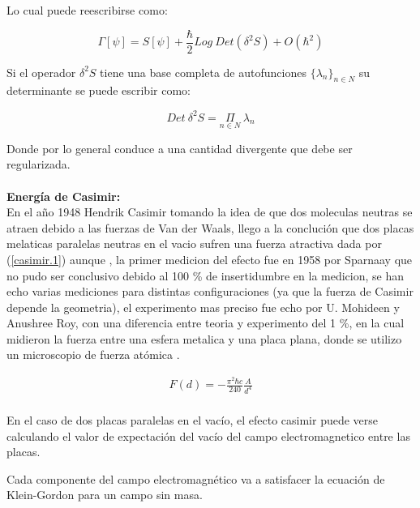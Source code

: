 Lo cual puede reescribirse como:

\begin{equation}
\Gamma [\psi] = S [\psi] + \frac{\hbar}{2} Log \ Det ( \delta ^2 S ) +
O ( \hbar ^2 )
\end{equation}


Si el operador $ \delta ^2 S $ tiene una base completa de autofunciones $ \{ \lambda _n \} _{n \in N}$ su determinante se puede escribir como:

\begin{equation}
Det \ \delta ^2 S = \underset{ n \in N }{ \Pi } \ \lambda _n
\end{equation}

Donde por lo general conduce a una cantidad divergente que debe ser regularizada.\\ \\



\textbf{Energía de Casimir:} \\ 

En el año 1948 Hendrik Casimir tomando la idea de que dos moleculas neutras se atraen debido a las fuerzas de Van der Waals, llego a la conclución que dos placas melaticas paralelas neutras en el vacio sufren una fuerza atractiva dada por (\ref{casimir.1}) aunque , la primer medicion del efecto fue en 1958 por Sparnaay que no pudo ser conclusivo debido al 100 \% de insertidumbre en la medicion, se han echo varias mediciones para distintas configuraciones (ya que la fuerza de Casimir depende la geometria), el experimento mas preciso fue echo por U. Mohideen y Anushree Roy, con una diferencia entre teoria y experimento del 1 \%, en la cual midieron la fuerza entre una esfera metalica y una placa plana, donde se utilizo un microscopio de fuerza atómica \cite{BORDAG20011} .


\begin{equation}
\begin{array}{c}
F(d) = - \frac{\pi ^2 \hbar c}{240} \frac{A}{d^4} \\
\end{array} 
\label{casimir.1}
\end{equation}


En el caso de dos placas paralelas en el vacío, el efecto casimir puede verse calculando el valor de expectación del vacío del campo electromagnetico entre las placas.

Cada componente del campo electromagnético va a satisfacer la ecuación de Klein-Gordon para un campo sin masa.

